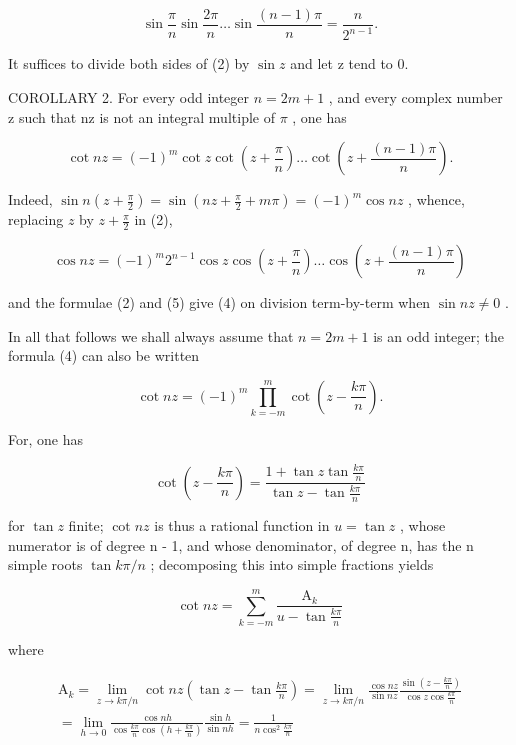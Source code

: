 \[
\sin \frac {\pi}{n} \sin \frac {2 \pi}{n} \dots \sin \frac {(n - 1) \pi}{n} = \frac {n}{2 ^ {n - 1}}.\tag{3}
\]

It suffices to divide both sides of (2) by \(\sin z\) and let z tend to 0.

COROLLARY 2. For every odd integer \(n = 2m + 1\) , and every complex number z such that nz is not an integral multiple of \(\pi\) , one has

\[
\cot n z = (- 1) ^ {m} \cot z \cot \left(z + \frac {\pi}{n}\right) \dots \cot \left(z + \frac {(n - 1) \pi}{n}\right).\tag{4}
\]

Indeed, \(\sin n\left(z + \frac{\pi}{2}\right) = \sin \left(nz + \frac{\pi}{2} + m\pi\right) = (-1)^m\cos nz\) , whence, replacing \(z\) by \(z + \frac{\pi}{2}\) in (2),

\[
\cos n z = (- 1) ^ {m} 2 ^ {n - 1} \cos z \cos \left(z + \frac {\pi}{n}\right) \dots \cos \left(z + \frac {(n - 1) \pi}{n}\right)\tag{5}
\]

and the formulae (2) and (5) give (4) on division term-by-term when \(\sin nz \neq 0\) .

In all that follows we shall always assume that \(n = 2m + 1\) is an odd integer; the formula (4) can also be written

\[
\cot n z = (- 1) ^ {m} \prod_ {k = - m} ^ {m} \cot \left(z - \frac {k \pi}{n}\right).
\]

For, one has

\[
\cot \left(z - \frac {k \pi}{n}\right) = \frac {1 + \tan z \tan \frac {k \pi}{n}}{\tan z - \tan \frac {k \pi}{n}}
\]

for \(\tan z\) finite; \(\cot nz\) is thus a rational function in \(u = \tan z\) , whose numerator is of degree n - 1, and whose denominator, of degree n, has the n simple roots \(\tan k\pi/n\) ; decomposing this into simple fractions yields

\[
\cot n z = \sum_ {k = - m} ^ {m} \frac {\mathrm{A} _ {k}}{u - \tan \frac {k \pi}{n}}\tag{6}
\]

where

\[
\begin{array}{l}\mathrm{A} _ {k} = \lim _ {z \rightarrow k \pi / n} \cot n z \left(\tan z - \tan \frac {k \pi}{n}\right) = \lim _ {z \rightarrow k \pi / n} \frac {\cos n z}{\sin n z} \frac {\sin \left(z - \frac {k \pi}{n}\right)}{\cos z \cos \frac {k \pi}{n}}\\= \lim _ {h \rightarrow 0} \frac {\cos n h}{\cos \frac {k \pi}{n} \cos \left(h + \frac {k \pi}{n}\right)} \frac {\sin h}{\sin n h} = \frac {1}{n \cos^ {2} \frac {k \pi}{n}}\end{array}
\]

